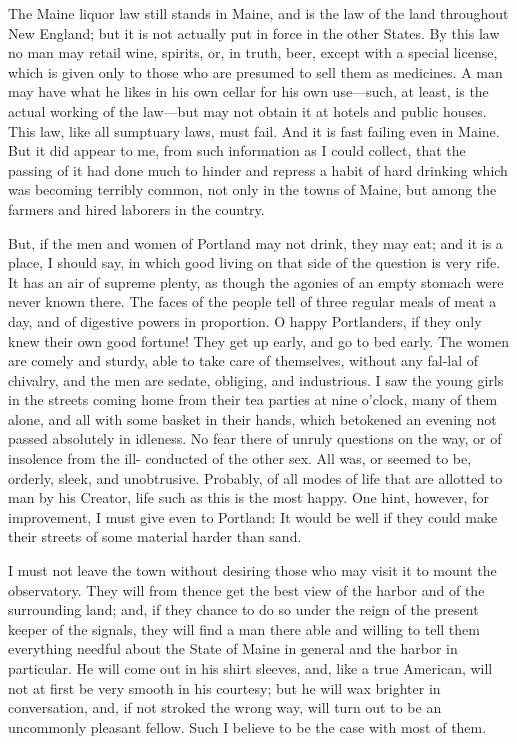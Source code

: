 The Maine liquor law still stands in Maine, and is the law of the
land throughout New England; but it is not actually put in force in
the other States.  By this law no man may retail wine, spirits, or,
in truth, beer, except with a special license, which is given only
to those who are presumed to sell them as medicines.  A man may
have what he likes in his own cellar for his own use---such, at
least, is the actual working of the law---but may not obtain it at
hotels and public houses.  This law, like all sumptuary laws, must
fail.  And it is fast failing even in Maine.  But it did appear to
me, from such information as I could collect, that the passing of
it had done much to hinder and repress a habit of hard drinking
which was becoming terribly common, not only in the towns of Maine,
but among the farmers and hired laborers in the country.

But, if the men and women of Portland may not drink, they may eat;
and it is a place, I should say, in which good living on that side
of the question is very rife.  It has an air of supreme plenty, as
though the agonies of an empty stomach were never known there.  The
faces of the people tell of three regular meals of meat a day, and
of digestive powers in proportion.  O happy Portlanders, if they
only knew their own good fortune!  They get up early, and go to bed
early.  The women are comely and sturdy, able to take care of
themselves, without any fal-lal of chivalry, and the men are
sedate, obliging, and industrious.  I saw the young girls in the
streets coming home from their tea parties at nine o'clock, many of
them alone, and all with some basket in their hands, which
betokened an evening not passed absolutely in idleness.  No fear
there of unruly questions on the way, or of insolence from the ill-
conducted of the other sex.  All was, or seemed to be, orderly,
sleek, and unobtrusive.  Probably, of all modes of life that are
allotted to man by his Creator, life such as this is the most
happy.  One hint, however, for improvement, I must give even to
Portland: It would be well if they could make their streets of some
material harder than sand.

I must not leave the town without desiring those who may visit it
to mount the observatory.  They will from thence get the best view
of the harbor and of the surrounding land; and, if they chance to
do so under the reign of the present keeper of the signals, they
will find a man there able and willing to tell them everything
needful about the State of Maine in general and the harbor in
particular.  He will come out in his shirt sleeves, and, like a
true American, will not at first be very smooth in his courtesy;
but he will wax brighter in conversation, and, if not stroked the
wrong way, will turn out to be an uncommonly pleasant fellow.  Such
I believe to be the case with most of them.

